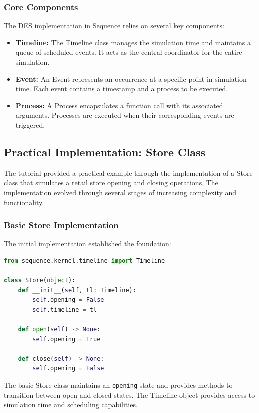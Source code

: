 \subsubsection{Core Components}

The DES implementation in Sequence relies on several key components:

\begin{itemize}
    \item \textbf{Timeline:} The Timeline class manages the simulation time and maintains a queue of scheduled events. It acts as the central coordinator for the entire simulation.
    \item \textbf{Event:} An Event represents an occurrence at a specific point in simulation time. Each event contains a timestamp and a process to be executed.
    \item \textbf{Process:} A Process encapsulates a function call with its associated arguments. Processes are executed when their corresponding events are triggered.
\end{itemize}

\subsection{Practical Implementation: Store Class}

The tutorial provided a practical example through the implementation of a Store class that simulates a retail store opening and closing operations. The implementation evolved through several stages of increasing complexity and functionality.

\subsubsection{Basic Store Implementation}

The initial implementation established the foundation:

\begin{lstlisting}[language=Python, breaklines=true]
from sequence.kernel.timeline import Timeline

class Store(object):
    def __init__(self, tl: Timeline):
        self.opening = False
        self.timeline = tl

    def open(self) -> None:
        self.opening = True

    def close(self) -> None:
        self.opening = False
\end{lstlisting}

The basic Store class maintains an \texttt{opening} state and provides methods to transition between open and closed states. The Timeline object provides access to simulation time and scheduling capabilities.


